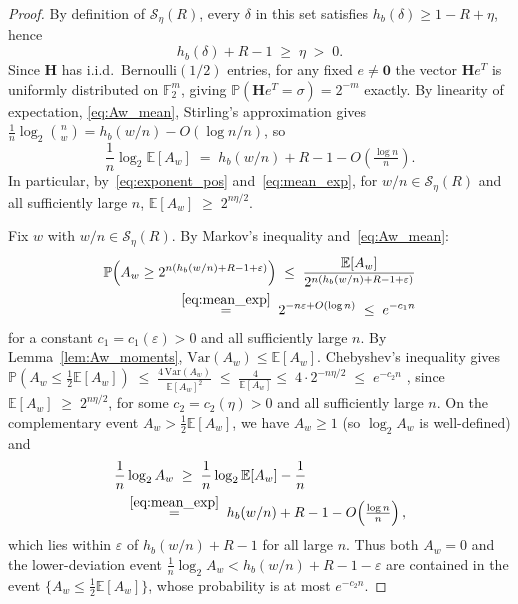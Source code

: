 \documentclass[journal,10pt,onecolumn]{IEEEtran}
\newcommand{\Fb}{\mathbb{F}}
\newcommand{\Eb}{\mathbb{E}}
\newcommand{\Pb}{\mathbb{P}}
\newcommand{\Hb}{h_b}
\newcommand{\Seta}{\mathcal{S}}
\newcommand{\eps}{\varepsilon}
\newcommand{\Hm}{\mathbf{H}}
\begin{document}
\begin{proof}
By definition of $\Seta_\eta(R)$, every $\delta$ in this set
satisfies $\Hb(\delta)\ge 1-R+\eta$, hence
\begin{equation}
    \Hb(\delta)+R-1 \;\ge\; \eta \;>\; 0.
    \label{eq:exponent_pos}
\end{equation}
Since $\Hm$ has i.i.d.\ $\mathrm{Bernoulli}(1/2)$ entries, for any
fixed $e\ne\bm{0}$ the vector $\Hm e^T$ is uniformly distributed on
$\Fb_2^m$, giving $\Pb(\Hm e^T=\sigma)=2^{-m}$ exactly.
By linearity of expectation, \eqref{eq:Aw_mean}, 
Stirling's approximation gives
$\frac{1}{n}\log_2\binom{n}{w}=\Hb(w/n)-O(\log n/n)$,
so
\begin{equation}
    \frac{1}{n}\log_2\Eb[A_w]
    \;=\;
    \Hb(w/n)+R-1-O\!\left(\tfrac{\log n}{n}\right).
    \label{eq:mean_exp}
\end{equation}
In particular, by~\eqref{eq:exponent_pos} and~\eqref{eq:mean_exp},
for $w/n\in\Seta_\eta(R)$ and all sufficiently large $n$,
\(
    \Eb[A_w] \;\ge\; 2^{n\eta/2}.
\)

Fix $w$ with $w/n\in\Seta_\eta(R)$.
By Markov's inequality and~\eqref{eq:Aw_mean}:
\begin{align}
    \Pb\!\left(A_w\ge 2^{n(\Hb(w/n)+R-1+\eps)}\right)
    \;\le\;
    \frac{\Eb[A_w]}{2^{n(\Hb(w/n)+R-1+\eps)}} \nonumber \\
    \;\stackrel{\eqref{eq:mean_exp}}{=}\;
    2^{-n\eps+O(\log n)}
    \;\le\;
    e^{-c_1 n}
\end{align}
for a constant $c_1=c_1(\eps)>0$ and all sufficiently large $n$.
By Lemma~\ref{lem:Aw_moments}, $\mathrm{Var}(A_w)\le\Eb[A_w]$.
Chebyshev's inequality gives
\(
    \Pb\!\left(A_w \le \tfrac{1}{2}\Eb[A_w]\right)
    \;\le\;
    \frac{4\,\mathrm{Var}(A_w)}{\Eb[A_w]^2}
    \;\le\;
    \frac{4}{\Eb[A_w]}
    \le\;
    4\cdot 2^{-n\eta/2}
    \;\le\;
    e^{-c_2 n}
\)
, since \(\Eb[A_w] \;\ge\; 2^{n\eta/2}\),
for some $c_2=c_2(\eta)>0$ and all sufficiently large $n$.
On the complementary event $A_w>\frac{1}{2}\Eb[A_w]$,
we have $A_w\ge 1$ (so $\log_2 A_w$ is well-defined) and
\begin{align}
    \frac{1}{n} & \log_2 A_w
    \;\ge\;
    \frac{1}{n}\log_2\Eb[A_w] - \frac{1}{n} \nonumber \\
    & \stackrel{\eqref{eq:mean_exp}}{=}\;
    \Hb(w/n)+R-1 - O\!\left(\tfrac{\log n}{n}\right),
\end{align}
which lies within $\eps$ of $\Hb(w/n)+R-1$ for all large $n$.
Thus both $A_w=0$ and the lower-deviation event
$\frac{1}{n}\log_2 A_w < \Hb(w/n)+R-1-\eps$
are contained in the event $\{A_w\le\frac{1}{2}\Eb[A_w]\}$,
whose probability is at most $e^{-c_2 n}$.


\end{proof}
\end{document}
